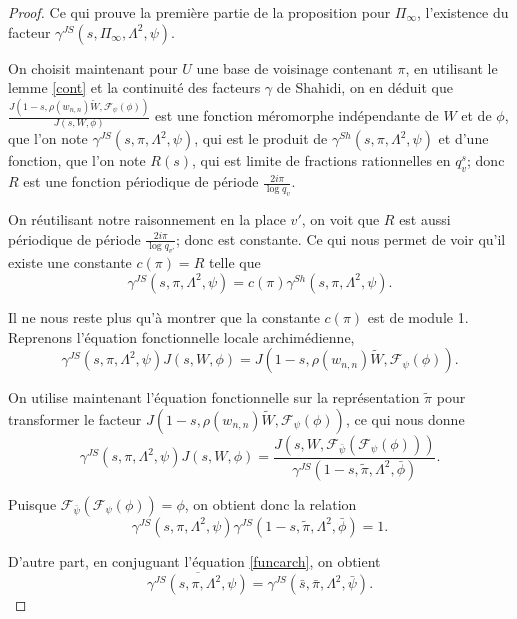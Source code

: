 \documentclass{amsart}
\begin{document}
\begin{proof}
 Ce qui prouve la première partie de la proposition pour $\Pi_\infty$, l'existence du facteur $\gamma^{JS}(s, \Pi_\infty, \Lambda^2, \psi)$.
 
 On choisit maintenant pour $U$ une base de voisinage contenant $\pi$, en utilisant le lemme \ref{cont} et la continuité des facteurs $\gamma$ de Shahidi, on en déduit que $\frac{J(1-s, \rho(w_{n,n})\tilde{W}, \mathcal{F}_\psi(\phi))}{J(s, W, \phi)}$
 est une fonction méromorphe indépendante de $W$ et de $\phi$, que l'on note $\gamma^{JS}(s, \pi, \Lambda^2, \psi)$, qui est le produit de $\gamma^{Sh}(s, \pi, \Lambda^2, \psi)$ et d'une fonction, que l'on note $R(s)$, qui est limite de fractions rationnelles en $q_v^s$; donc $R$ est une fonction périodique de période $\frac{2i\pi}{\log q_v}$.
 
  On réutilisant notre raisonnement en la place $v'$, on voit que $R$ est aussi périodique de période $\frac{2i\pi}{\log q_{v'}}$; donc est constante. Ce qui nous permet de voir qu'il existe une constante $c(\pi)=R$ telle que
 \begin{equation}
 \gamma^{JS}(s, \pi, \Lambda^2, \psi) = c(\pi)\gamma^{Sh}(s, \pi, \Lambda^2, \psi).
 \end{equation}
 
 Il ne nous reste plus qu'à montrer que la constante $c(\pi)$ est de module 1. Reprenons l'équation fonctionnelle locale archimédienne,
 \begin{equation}
 \label{funcarch}
 \gamma^{JS}(s, \pi, \Lambda^2, \psi) J(s, W, \phi) = J(1-s, \rho(w_{n,n})\tilde{W}, \mathcal{F}_\psi(\phi)).
 \end{equation}
 
 On utilise maintenant l'équation fonctionnelle sur la représentation $\tilde{\pi}$ pour transformer le facteur $J(1-s, \rho(w_{n,n})\tilde{W}, \mathcal{F}_\psi(\phi))$, ce qui nous donne
 \begin{equation}
 \gamma^{JS}(s, \pi, \Lambda^2, \psi) J(s, W, \phi) = \frac{J(s, W, \mathcal{F}_{\bar{\psi}}(\mathcal{F}_\psi(\phi)))}{\gamma^{JS}(1-s, \tilde{\pi}, \Lambda^2, \bar{\phi})}.
 \end{equation}
 
 Puisque $\mathcal{F}_{\bar{\psi}}(\mathcal{F}_\psi(\phi)) = \phi$, on obtient donc la relation 
 \begin{equation}
 \gamma^{JS}(s, \pi, \Lambda^2, \psi)\gamma^{JS}(1-s, \tilde{\pi}, \Lambda^2, \bar{\phi}) = 1.
 \end{equation}
 
 D'autre part, en conjuguant l'équation \ref{funcarch}, on obtient
 \begin{equation}
 \overline{\gamma^{JS}(s, \pi, \Lambda^2, \psi)} = \gamma^{JS}(\bar{s}, \bar{\pi}, \Lambda^2, \bar{\psi}).
 \end{equation}
 

\end{proof}
\end{document}
